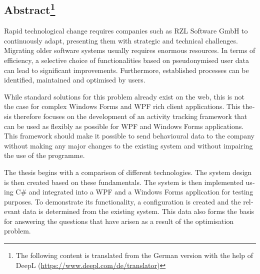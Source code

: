 \begin{english} %

\chapter[Abstract]{Abstract\protect\footnote{The following content is translated from the German version with the help of DeepL (\url{https://www.deepl.com/de/translator})}}

Rapid technological change requires companies such as RZL Software GmbH to continuously adapt, presenting them with strategic and technical challenges. Migrating older software systems usually requires enormous resources. In terms of efficiency, a selective choice of functionalities based on pseudonymised user data can lead to significant improvements. Furthermore, established processes can be identified, maintained and optimised by users.

While standard solutions for this problem already exist on the web, this is not the case for complex Windows Forms and WPF rich client applications. This thesis therefore focuses on the development of an activity tracking framework that can be used as flexibly as possible for WPF and Windows Forms applications. This framework should make it possible to send behavioural data to the company without making any major changes to the existing system and without impairing the use of the programme.

The thesis begins with a comparison of different technologies. The system design is then created based on these fundamentals. The system is then implemented using C\# and integrated into a WPF and a Windows Forms application for testing purposes. To demonstrate its functionality, a configuration is created and the relevant data is determined from the existing system. This data also forms the basis for answering the questions that have arisen as a result of the optimisation problem.

\end{english}

